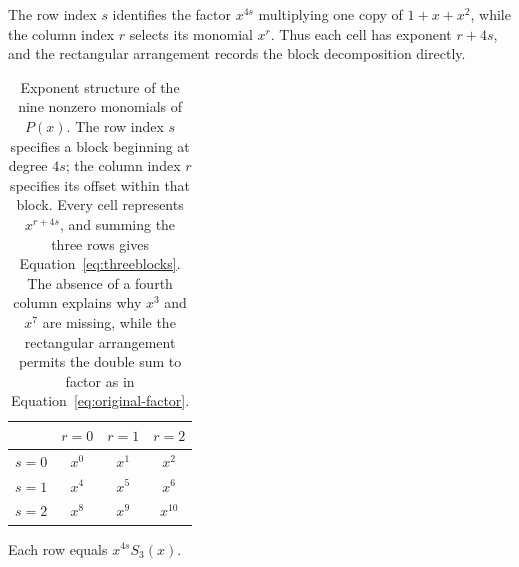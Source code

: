 \documentclass[11pt,a4paper]{article}
\numberwithin{equation}{section}
\theoremstyle{uprightpaper}
\begin{document}
\begin{table}[htbp]
\centering
\begin{minipage}[c]{0.46\linewidth}
\small\setlength{\parindent}{0pt}
The row index $s$ identifies the factor $x^{4s}$ multiplying one copy of $1+x+x^2$, while the column index $r$ selects its monomial $x^r$. Thus each cell has exponent $r+4s$, and the rectangular arrangement records the block decomposition directly.
\end{minipage}\hfill
\begin{minipage}[c]{0.51\linewidth}
\centering
\renewcommand{\arraystretch}{1.55}
\setlength{\tabcolsep}{6pt}
\begin{tabular}{@{}c ccc@{}}
\toprule
 & $r=0$ & $r=1$ & $r=2$\\
\midrule
$s=0$ & $x^{0}$ & $x^{1}$ & $x^{2}$\\
$s=1$ & $x^{4}$ & $x^{5}$ & $x^{6}$\\
$s=2$ & $x^{8}$ & $x^{9}$ & $x^{10}$\\
\bottomrule
\end{tabular}
\par\vspace{5pt}\footnotesize Each row equals $x^{4s}S_3(x)$.
\end{minipage}
\caption{Exponent structure of the nine nonzero monomials of $P(x)$.
The row index $s$ specifies a block beginning at degree $4s$; the column
index $r$ specifies its offset within that block. Every cell represents
$x^{r+4s}$, and summing the three rows gives Equation~\eqref{eq:threeblocks}.
The absence of a fourth column explains why $x^3$ and $x^7$ are
missing, while the rectangular arrangement permits the double sum to
factor as in Equation~\eqref{eq:original-factor}.}
\label{tab:exponents}
\end{table}
\end{document}
